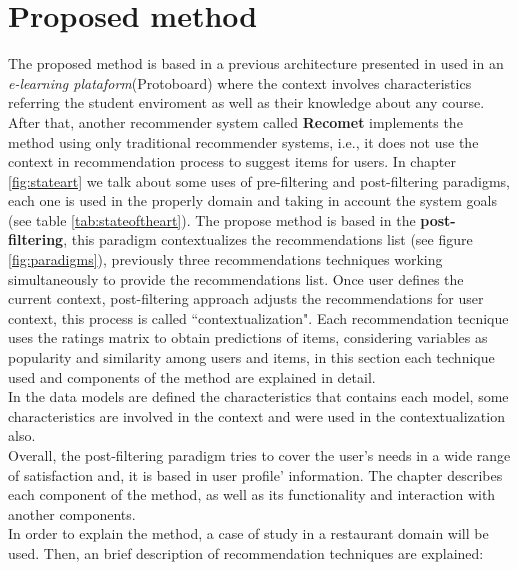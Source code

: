 \chapter{Proposed method}\label{method}

The proposed method is based  in a previous architecture presented in
\cite{profe} used in an \textit{e-learning plataform}(Protoboard)
where the context  involves characteristics referring the student
enviroment as well as their knowledge about any course.  After that,
another recommender system called \textbf{Recomet} \cite{recomet}
implements the method using only traditional recommender systems,
i.e., it does not use the context in recommendation process  to
suggest items for users.  
In chapter \ref{fig:stateart} we talk about some uses of pre-filtering and 
post-filtering paradigms, each one is used in the properly domain 
and taking in account the system goals (see table \ref{tab:stateoftheart}).  
The propose method is based in the \textbf{post-filtering}, 
this paradigm contextualizes the recommendations list
(see figure \ref{fig:paradigms}), previously three recommendations
techniques  working simultaneously to provide the recommendations
list. Once user  defines the current context,  post-filtering approach
adjusts the  recommendations for user context, this process is called
``contextualization". 
Each recommendation tecnique uses the ratings
matrix to obtain  predictions of items, considering variables as
popularity and similarity   among users and items, in this section
each technique used and  components of the method are explained in
detail.\\  In the data models are defined the characteristics that
contains  each model, some characteristics are involved in the context
and were used in the contextualization also.\\  Overall, the 
post-filtering paradigm tries to cover the  user's needs in a wide range of
satisfaction and, it is based in user  profile' information. The
chapter describes  each component of the  method, as well as its
functionality and  interaction with  another components.\\ 
In order to explain the method, a case of study in a
restaurant   domain will be used. Then, an brief description of
recommendation  techniques are explained: 
